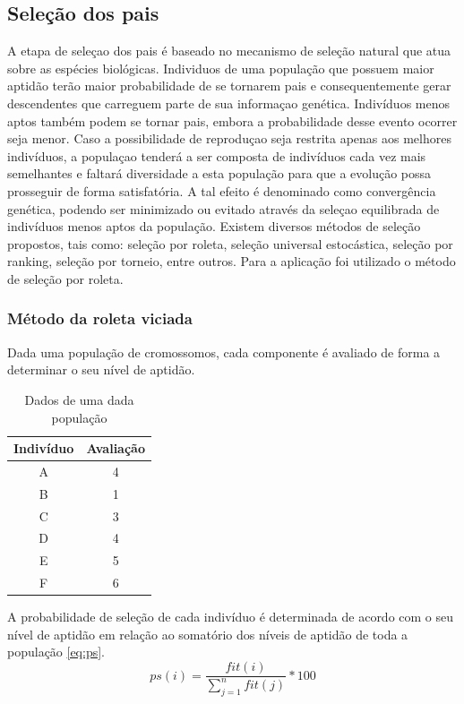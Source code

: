 \documentclass[twoside]{article}
\begin{document}
\begin{multicols}{2}
\subsection{Seleção dos pais}
A etapa de seleçao dos pais é baseado no mecanismo de seleção natural que atua sobre as espécies biológicas. Individuos de uma população que possuem maior aptidão terão maior probabilidade de se tornarem pais e consequentemente gerar descendentes que carreguem parte de sua informaçao genética. Indivíduos menos aptos também podem se tornar pais, embora a probabilidade desse evento ocorrer seja menor. Caso a possibilidade de reproduçao seja restrita apenas aos melhores indivíduos, a populaçao tenderá a ser composta de indivíduos cada vez mais semelhantes e faltará diversidade a esta população para que a evolução possa prosseguir de forma satisfatória. A tal efeito é denominado como convergência genética, podendo ser minimizado ou evitado através da seleçao equilibrada de indivíduos menos aptos da população. Existem diversos métodos de seleção propostos, tais como: seleção por roleta, seleção universal estocástica, seleção por ranking, seleção por torneio, entre outros. Para a aplicação foi utilizado o método de seleção por roleta.

\subsubsection{Método da roleta viciada}
Dada uma população de cromossomos, cada componente é avaliado de forma a determinar o seu nível de aptidão. 
\begin{table}[H]
\caption{Dados de uma dada população}
\centering
\begin{tabular}{cc}
\toprule
Indivíduo & Avaliação \\
\midrule
A & 4\\
B & 1\\
C & 3\\
D & 4\\
E & 5\\
F & 6\\
\bottomrule
\end{tabular}
\end{table}

A probabilidade de seleção de cada indivíduo é determinada de acordo com o seu nível de aptidão em relação ao somatório dos níveis de aptidão de toda a população \ref{eq:ps}. 
\begin{equation}
\label{eq:ps}
ps(i) = \frac {fit(i)}{\sum\limits_{j=1}^n fit(j)} * 100
\end{equation}


\end{multicols}
\end{document}
